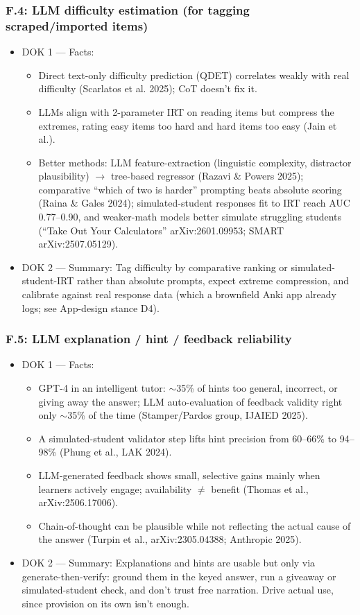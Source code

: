\documentclass[11pt]{article}
\begin{document}
\subsubsection*{F.4: LLM difficulty estimation (for tagging scraped/imported items)}
\begin{itemize}
\item DOK 1 --- Facts:
\begin{itemize}
\item Direct text-only difficulty prediction (QDET) correlates weakly with real difficulty (Scarlatos et al. 2025); CoT doesn't fix it.
\item LLMs align with 2-parameter IRT on reading items but compress the extremes, rating easy items too hard and hard items too easy (Jain et al.).
\item Better methods: LLM feature-extraction (linguistic complexity, distractor plausibility) $\rightarrow$ tree-based regressor (Razavi \& Powers 2025); comparative \enquote{which of two is harder} prompting beats absolute scoring (Raina \& Gales 2024); simulated-student responses fit to IRT reach AUC 0.77--0.90, and weaker-math models better simulate struggling students (\enquote{Take Out Your Calculators} arXiv:2601.09953; SMART arXiv:2507.05129).
\end{itemize}
\item DOK 2 --- Summary: Tag difficulty by comparative ranking or simulated-student-IRT rather than absolute prompts, expect extreme compression, and calibrate against real response data (which a brownfield Anki app already logs; see App-design stance D4).
\end{itemize}
\subsubsection*{F.5: LLM explanation / hint / feedback reliability}
\begin{itemize}
\item DOK 1 --- Facts:
\begin{itemize}
\item GPT-4 in an intelligent tutor: $\sim$35\% of hints too general, incorrect, or giving away the answer; LLM auto-evaluation of feedback validity right only $\sim$35\% of the time (Stamper/Pardos group, IJAIED 2025).
\item A simulated-student validator step lifts hint precision from 60--66\% to 94--98\% (Phung et al., LAK 2024).
\item LLM-generated feedback shows small, selective gains mainly when learners actively engage; availability $\neq$ benefit (Thomas et al., arXiv:2506.17006).
\item Chain-of-thought can be plausible while not reflecting the actual cause of the answer (Turpin et al., arXiv:2305.04388; Anthropic 2025).
\end{itemize}
\item DOK 2 --- Summary: Explanations and hints are usable but only via generate-then-verify: ground them in the keyed answer, run a giveaway or simulated-student check, and don't trust free narration. Drive actual use, since provision on its own isn't enough.
\end{itemize}
\end{document}

